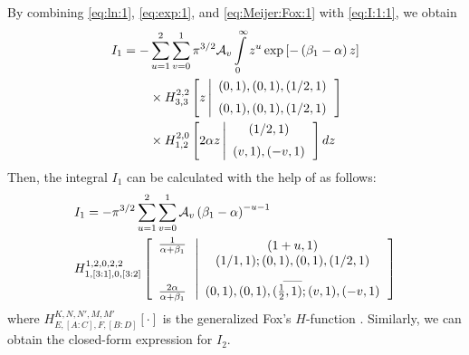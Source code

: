 \documentclass[conference]{IEEEtran}
\begin{document}
%
%
By combining \eqref{eq:ln:1}, \eqref{eq:exp:1}, and
\eqref{eq:Meijer:Fox:1} with \eqref{eq:I:1:1}, we obtain
%
%
\begin{align} \label{eq:I:1:2}
    I_1
    =
    -
    &\sum\limits_{u=1}^{2}
    \sum\limits_{v=0}^{1}
    \pi^{3/2}
    \mathcal{A}_v
    \int\limits_{0}^{\infty}
    z^u
    \exp\left[-\left(\beta_1 - \alpha\right)z\right]
    \nonumber
    \\
    &\times
    H_{3,3}^{2,2}\left[ {z} \left|{\begin{array}{*{20}c} {(0,1),(0,1),(1/2,1)}  \vspace{0.2cm}\\
    {(0,1),(0,1),(1/2,1)} \end{array}} \right.\right]
    \nonumber
    \\
    &\times
    H_{1,2}^{2,0}\left[{2\alpha z} \left|{\begin{array}{*{20}c} {(1/2,1)}  \vspace{0.2cm}\\
    {(v,1),(-v,1)} \end{array}} \right. \right]
    dz
\end{align}
%
%
Then, the integral $I_1$ can be calculated with the help of
\cite[eq.~(2.6.2)]{Mathai:78:Book} as follows:
%
%
\begin{align} \label{eq:I:1:3}
    &I_1
    =
    -\pi^{3/2}
    \sum\limits_{u=1}^{2}
    \sum\limits_{v=0}^{1}
    \mathcal{A}_v
    \left(\beta_1 - \alpha\right)^{-u-1}
    \nonumber
    \\
    &
H_{1,[3:1],0,[3:2]}^{1,2,0,2,2}\left[ {\begin{array}{*{20}c}
   \frac{1}{\alpha+\beta_1}  \\
   \\
   \\
   \frac{2\alpha}{\alpha+\beta_1}  \\
\end{array}\left| {\begin{array}{*{20}c}
   (1+u,1)  \\
   (1/1,1);(0,1),(0,1),(1/2,1)  \\
   {\_}{\_} \\
   (0,1),(0,1),(\tfrac{1}{2},1);(v,1),(-v,1)  \\
\end{array}} \right.} \right]
\end{align}
%
%
where $H_{E,[A:C],F,[B:D]}^{K,N,N',M,M'}[\cdot]$ is the generalized
Fox's $H$-function \cite[eq.~(2.2.1)]{Mathai:78:Book}. Similarly, we
can obtain the closed-form expression for $I_2$.
\end{document}
